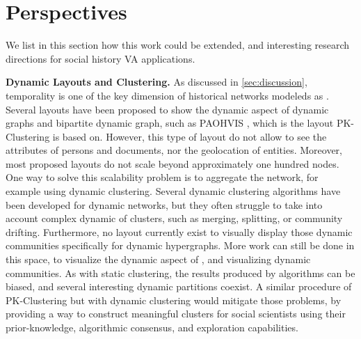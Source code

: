 \section{Perspectives}

We list in this section how this work could be extended, and interesting research directions for social history VA applications.


\noindent\textbf{Dynamic Layouts and Clustering.} As discussed in \autoref{sec:discussion}, temporality is one of the key dimension of historical networks modeleds as \modelplural.
Several layouts have been proposed to show the dynamic aspect of dynamic graphs and bipartite dynamic graph, such as PAOHVIS \cite{valdiviaAnalyzingDynamicHypergraphs2021}, which is the layout PK-Clustering is based on.
However, this type of layout do not allow to see the attributes of persons and documents, nor the geolocation of entities.
Moreover, most proposed layouts do not scale beyond approximately one hundred nodes.
One way to solve this scalability problem is to aggregate the network, for example using dynamic clustering.
Several dynamic clustering algorithms have been developed for dynamic networks, but they often struggle to take into account complex dynamic of clusters, such as merging, splitting, or community drifting.
Furthermore, no layout currently exist to visually display those dynamic communities specifically for dynamic hypergraphs.
More work can still be done in this space, to visualize the dynamic aspect of \modelplural, and visualizing dynamic communities.
As with static clustering, the results produced by algorithms can be biased, and several interesting dynamic partitions coexist.
A similar procedure of PK-Clustering but with dynamic clustering would mitigate those problems, by providing a way to construct meaningful clusters for social scientists using their prior-knowledge, algorithmic consensus, and exploration capabilities.













